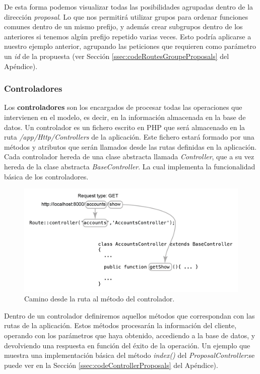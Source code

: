 De esta forma podemos visualizar todas las posibilidades agrupadas dentro de la dirección \textit{proposal}. Lo que nos permitirá utilizar grupos para ordenar funciones comunes dentro de un mismo prefijo, y además crear subgrupos dentro de los anteriores si tenemos algún prefijo repetido varias veces. Esto podría aplicarse a nuestro ejemplo anterior, agrupando las peticiones que requieren como parámetro un \textit{id} de la propuesta (ver Sección \ref{ssec:codeRoutesGroupeProposals} del Apéndice).

\subsubsection{Controladores}

Los \textbf{controladores} son los encargados de procesar todas las operaciones que intervienen en el modelo, es decir, en la información almacenada en la base de datos. Un controlador es un fichero escrito en PHP que será almacenado en la ruta \textit{/app/Http/Controllers} de la aplicación. Este fichero estará formado por una métodos y atributos que serán llamados desde las rutas definidas en la aplicación. Cada controlador hereda de una clase abstracta llamada \textit{Controller}, que a su vez hereda de la clase abstracta \textit{BaseController}. La cual implementa la funcionalidad básica de los controladores.

\begin{figure}[H]
\centering
\includegraphics[keepaspectratio, scale=1]{Media/Captures/getDiagramMethod.png}
\caption{Camino desde la ruta al método del controlador.}
\label{fig:laravelArch}
\end{figure}

Dentro de un controlador definiremos aquellos métodos que correspondan con las rutas de la aplicación. Estos métodos procesarán la información del cliente, operando con los parámetros que haya obtenido, accediendo a la base de datos, y devolviendo una respuesta en función del éxito de la operación. Un ejemplo que muestra una implementación básica del método \textit{index()} del \textit{ProposalController}:se puede ver en la Sección \ref{ssec:codeControllerProposals} del Apéndice).

